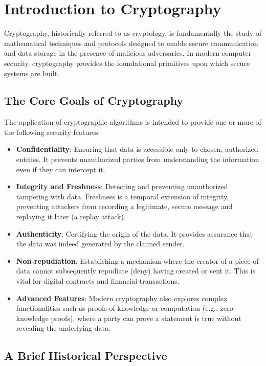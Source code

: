 \chapter{Introduction to Cryptography}
\label{ch:introduction_to_cryptography}

Cryptography, historically referred to as cryptology, is fundamentally the study of mathematical techniques and protocols designed to enable secure communication and data storage in the presence of malicious adversaries. In modern computer security, cryptography provides the foundational primitives upon which secure systems are built.

\section{The Core Goals of Cryptography}

The application of cryptographic algorithms is intended to provide one or more of the following security features:
\begin{itemize}
    \item \textbf{Confidentiality}: Ensuring that data is accessible only to chosen, authorized entities. It prevents unauthorized parties from understanding the information even if they can intercept it.
    \item \textbf{Integrity and Freshness}: Detecting and preventing unauthorized tampering with data. Freshness is a temporal extension of integrity, preventing attackers from recording a legitimate, secure message and replaying it later (a replay attack).
    \item \textbf{Authenticity}: Certifying the origin of the data. It provides assurance that the data was indeed generated by the claimed sender.
    \item \textbf{Non-repudiation}: Establishing a mechanism where the creator of a piece of data cannot subsequently repudiate (deny) having created or sent it. This is vital for digital contracts and financial transactions.
    \item \textbf{Advanced Features}: Modern cryptography also explores complex functionalities such as proofs of knowledge or computation (e.g., zero-knowledge proofs), where a party can prove a statement is true without revealing the underlying data.
\end{itemize}

\section{A Brief Historical Perspective}

